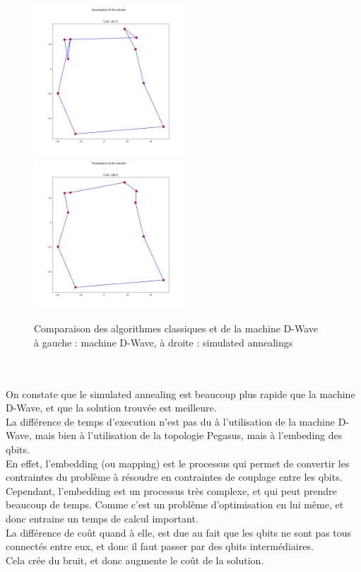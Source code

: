 \documentclass{article}
\begin{document}
        \begin{figure}[h]
            \includegraphics[width=0.5\textwidth]{quantum_annealing}
            \includegraphics[width=0.5\textwidth]{simulated_annealing}
            \caption{Comparaison des algorithmes classiques et de la machine D-Wave\\
            à gauche : machine D-Wave, à droite : simulated annealings}
            \label{fig:comparaison}
        \end{figure}\\\\
        On constate que le simulated annealing est beaucoup plus rapide que la machine D-Wave, et que la solution trouvée est meilleure.\\
        La différence de temps d'execution n'est pas du à l'utilisation de la machine D-Wave, mais bien à l'utilisation de la topologie Pegasus, mais à l'embeding des qbits.\\
        En effet, l'embedding (ou mapping) est le processus qui permet de convertir les contraintes du problème à résoudre en contraintes de couplage entre les qbits.\\
        Cependant, l'embedding est un processus très complexe, et qui peut prendre beaucoup de temps. Comme c'est un problème d'optimisation en lui même, et donc entraine un temps de calcul important.\\
        La différence de coût quand à elle, est due au fait que les qbits ne sont pas tous connectés entre eux, et donc il faut passer par des qbits intermédiaires.\\
        Cela crée du bruit, et donc augmente le coût de la solution.\\
\end{document}
